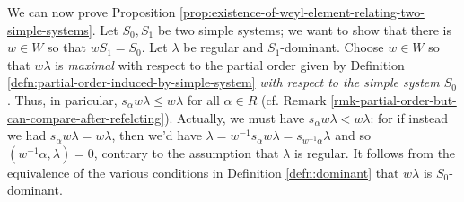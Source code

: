 \documentclass[reqno]{amsart} 
\begin{document}




We can now prove Proposition \ref{prop:existence-of-weyl-element-relating-two-simple-systems}.  Let $S_0, S_1$ be two simple systems; we want to show that there is $w \in W$ so that $w S_1 = S_0$.
Let $\lambda$ be regular and $S_1$-dominant.  Choose $w \in W$ so that $w \lambda$ is \emph{maximal} with respect to the partial order given by Definition \ref{defn:partial-order-induced-by-simple-system} \emph{with respect to the simple system $S_0$}.  Thus, in paricular, $s_\alpha w \lambda \leq w \lambda$ for all $\alpha \in R$ (cf. Remark \ref{rmk-partial-order-but-can-compare-after-refelcting}).  Actually, we must have $s_\alpha w \lambda < w \lambda$: for if instead we had $s_\alpha w \lambda = w \lambda$, then we'd have $\lambda = w^{-1} s_\alpha w \lambda = s_{w^{-1} \alpha} \lambda$ and so $(w^{-1} \alpha, \lambda) = 0$, contrary to the assumption that $\lambda$ is regular.  It follows from the equivalence of the various conditions in Definition \ref{defn:dominant} that $w \lambda$ is $S_0$-dominant.
\end{document}

